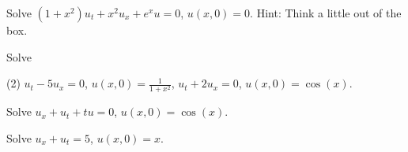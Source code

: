 \begin{exercise}
Solve $(1+x^2) u_t + x^2 u_x + e^x u = 0$, $u(x,0) = 0$.
Hint: Think a little out of the box.
\end{exercise}


\begin{exercise}
Solve
\begin{tasks}(2)
\task $u_t - 5u_x = 0$, $u(x,0) = \frac{1}{1+x^2}$,
\task $u_t + 2u_x = 0$, $u(x,0) = \cos(x)$.
\end{tasks}
\end{exercise}

\begin{exercise}
Solve $u_x+u_t+tu = 0$, $u(x,0) = \cos(x)$.
\end{exercise}

\begin{exercise}
Solve $u_x+u_t = 5$, $u(x,0) = x$.
\end{exercise}
